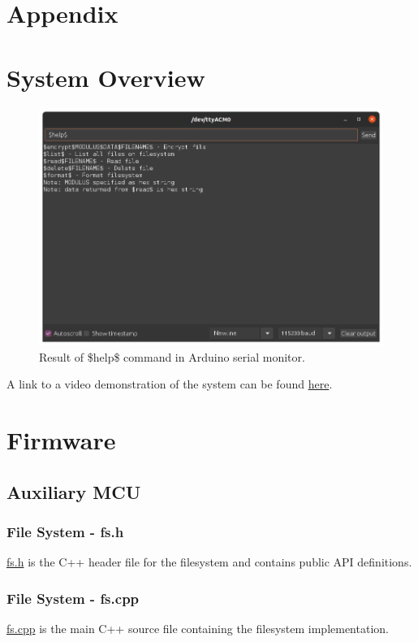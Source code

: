 \section{Appendix}
\appendix

\section{System Overview}
\label{sec:SystemOverview}
\begin{figure}[H]
\centering
\includegraphics[width=1\columnwidth]{Figures/Fig_80.png}
\caption{Result of \$help\$ command in Arduino serial monitor.}
\label{fig:gantt}
\end{figure}

A link to a video demonstration of the system can be found \href{https://www.youtube.com/watch?v=u4TFHCfZJ7M}{here}. 

\section{Firmware}
\subsection{Auxiliary MCU}
\subsubsection{File System - fs.h}
\label{sec:fsh}
\href{https://github.com/lunarjournal/EEE4022F/blob/main/Firmware/Auxiliary\%20MCU/fs.h}{fs.h} is the C++ header file for the filesystem and contains public API definitions. 
\subsubsection{File System - fs.cpp}
\label{sec:fscpp}
\href{https://github.com/lunarjournal/EEE4022F/blob/main/Firmware/Auxiliary\%20MCU/fs.cpp}{fs.cpp} is the main C++ source file containing the filesystem implementation.
